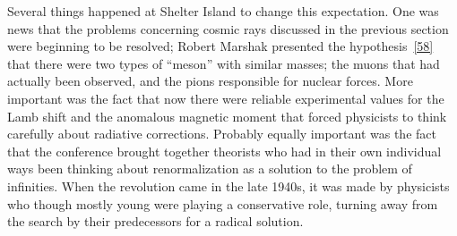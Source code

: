 Several things happened at Shelter Island to change this expectation. One was news that the problems concerning cosmic rays discussed in the previous section were beginning to be resolved; Robert Marshak presented the hypothesis~\hyperref[ref:1.58]{[58]} that there were two types of ``meson'' with similar masses; the muons that had actually been observed, and the pions responsible for nuclear forces. More important was the fact that now there were reliable experimental values for the Lamb shift and the anomalous magnetic moment that forced physicists to think carefully about radiative corrections. Probably equally important was the fact that the conference brought together theorists who had in their own individual ways been thinking about renormalization as a solution to the problem of infinities. When the revolution came in the late 1940s, it was made by physicists who though mostly young were playing a conservative role, turning away from the search by their predecessors for a radical solution.
